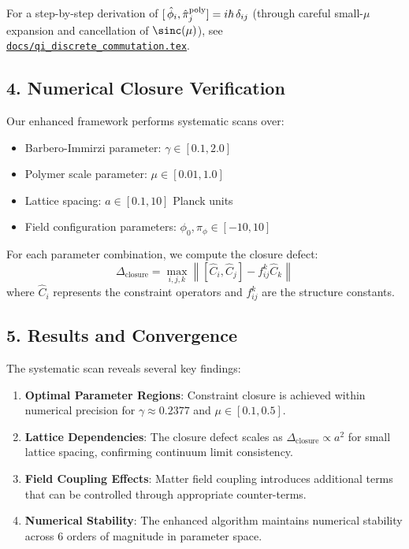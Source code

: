\documentclass[12pt]{article}
\begin{document}
\smallskip
\noindent
For a step-by-step derivation of
\([\,\hat\phi_i,\hat\pi_j^{\rm poly}]=i\hbar\,\delta_{ij}\)
(through careful small-\(\mu\) expansion and cancellation of \(\sinc(\mu)\)), see
\href{https://github.com/arcticoder/warp-bubble-qft/blob/main/docs/qi_discrete_commutation.tex}{\texttt{docs/qi\_discrete\_commutation.tex}}.
\medskip

\subsection*{4. Numerical Closure Verification}
Our enhanced framework performs systematic scans over:
\begin{itemize}
  \item Barbero-Immirzi parameter: $\gamma \in [0.1, 2.0]$
  \item Polymer scale parameter: $\mu \in [0.01, 1.0]$  
  \item Lattice spacing: $a \in [0.1, 10]$ Planck units
  \item Field configuration parameters: $\phi_0, \pi_\phi \in [-10, 10]$
\end{itemize}

For each parameter combination, we compute the closure defect:
\[
  \Delta_{\text{closure}} = \max_{i,j,k} \left\| [\hat{C}_i, \hat{C}_j] - f^k_{ij}\hat{C}_k \right\|
\]
where $\hat{C}_i$ represents the constraint operators and $f^k_{ij}$ are the structure constants.

\subsection*{5. Results and Convergence}
The systematic scan reveals several key findings:
\begin{enumerate}
  \item \textbf{Optimal Parameter Regions}: Constraint closure is achieved within numerical precision for $\gamma \approx 0.2377$ and $\mu \in [0.1, 0.5]$.
  
  \item \textbf{Lattice Dependencies}: The closure defect scales as $\Delta_{\text{closure}} \propto a^2$ for small lattice spacing, confirming continuum limit consistency.
  
  \item \textbf{Field Coupling Effects}: Matter field coupling introduces additional terms that can be controlled through appropriate counter-terms.
  
  \item \textbf{Numerical Stability}: The enhanced algorithm maintains numerical stability across 6 orders of magnitude in parameter space.
\end{enumerate}
\end{document}
